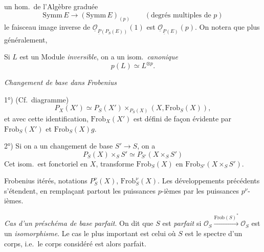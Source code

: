 \documentclass[11pt,a4paper]{article}
\begin{document}


un hom.\ de l'Algèbre graduée
\[
  \mathrm{Symm}\,E \longrightarrow (\mathrm{Symm}\,E)_{(p)}
  \qquad (\text{degrés multiples de } p)
\]
le faisceau image inverse de
$\underline{\mathcal{O}}_{\underline{P}(P_S(E))}(1)$ est
$\underline{\mathcal{O}}_{\underline{P}(E)}(p)$. On notera que plus
généralement,

Si $L$ est un Module \emph{inversible}, on a un isom.\ \emph{canonique}
\[
  p(L) \simeq L^{\otimes p} .
\]


\emph{Changement de base dans Frobenius}

\struck{[cf.\ diagramme]}

1°) (Cf.\ diagramme)
\[
  P_X(X') \simeq P_S(X') \times_{P_S(X)} (X, \mathrm{Frob}_S(X)) ,
\]
et avec cette identification, $\mathrm{Frob}_X(X')$ est
défini de façon évidente par
$\mathrm{Frob}_S(X')$ et $\mathrm{Frob}_S(X)g$.

2°) Si on a un changement de base $S' \to S$, on a
\[
  P_S(X) \times_S S' \simeq P_{S'}(X \times_S S')
\]
Cet isom.\ est fonctoriel en $X$, \struck{\ill{} \ill{}}
\ill{} \ill{} \ill{} \ill{} transforme $\mathrm{Frob}_S(X)$ en
$\mathrm{Frob}_{S'}(X \times_S S')$.


Frobenius itérés, notations $P^{\nu}_S(X)$, $\mathrm{Frob}^{\nu}_S(X)$. Les
développements précédents s'étendent, en remplaçant partout les puissances
$p$-ièmes par les puissances $p^{\nu}$-ièmes.

\emph{Cas d'un préschéma de base parfait}. On dit que $S$ est \emph{parfait}
si \struck{\ill{}}
$\mathcal{O}_S \xrightarrow{\mathrm{Frob}(S)^{*}} \mathcal{O}_S$ est un
\emph{isomorphisme}. Le cas le plus important est celui où $S$ est le
spectre d'un corps, %
i.e.\ le corps considéré est alors parfait.
\end{document}
